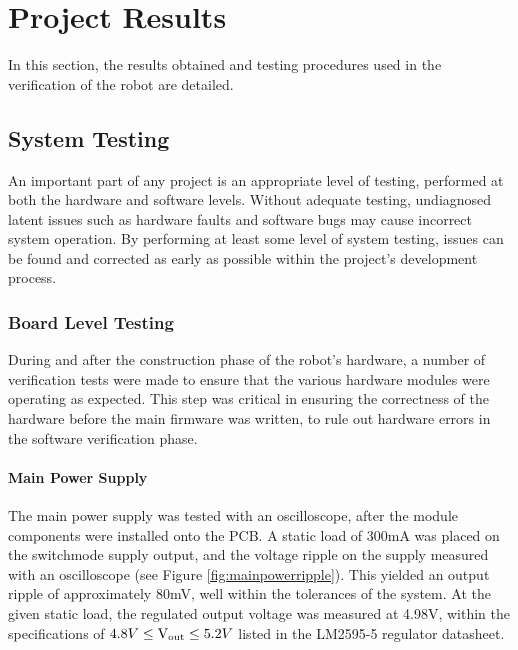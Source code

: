 \chapter{Project Results}
\label{chp:results}

In this section, the results obtained and testing procedures used in the verification of the robot are detailed.

\section{System Testing}

An important part of any project is an appropriate level of testing, performed at both the hardware and software levels. Without adequate testing, undiagnosed latent issues such as hardware faults and software bugs may cause incorrect system operation. By performing at least some level of system testing, issues can be found and corrected as early as possible within the project's development process.

\FloatBarrier
\subsection{Board Level Testing}

During and after the construction phase of the robot's hardware, a number of verification tests were made to ensure that the various hardware modules were operating as expected. This step was critical in ensuring the correctness of the hardware before the main firmware was written, to rule out hardware errors in the software verification phase.

\FloatBarrier
\subsubsection{Main Power Supply}

The main power supply was tested with an oscilloscope, after the module components were installed onto the PCB. A static load of 300mA was placed on the switchmode supply output, and the voltage ripple on the supply measured with an oscilloscope (see Figure \ref{fig:mainpowerripple}). This yielded an output ripple of approximately 80mV, well within the tolerances of the system. At the given static load, the regulated output voltage was measured at 4.98V, within the specifications of \(4.8V\leq\text{V\ensuremath{_{\textrm{out}}}}\leq5.2V\) listed in the LM2595-5 regulator datasheet.

